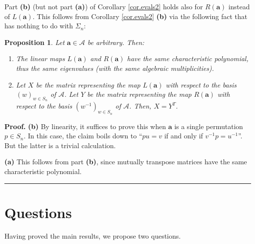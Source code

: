 \documentclass[submission]{FPSAC2026}
\newtheorem{proposition}{Proposition}
\newenvironment{proof}[1][Proof]{\noindent\textbf{#1.} }{\ \rule{0.5em}{0.5em}}
\begin{document}
Part \textbf{(b)} (but not part \textbf{(a)}) of Corollary \ref{cor.evals2}
holds also for $R\left(  \mathbf{a}\right)  $ instead of $L\left(
\mathbf{a}\right)  $. This follows from Corollary
\ref{cor.evals2} \textbf{(b)} via
the following fact that has nothing to do with $\Sigma_{n}$:

\begin{proposition}
\label{prop.L=R}Let $\mathbf{a}\in\mathcal{A}$ be arbitrary. Then:

\begin{enumerate}
\item[\textbf{(a)}] The linear maps $L\left(  \mathbf{a}\right)  $ and
$R\left(  \mathbf{a}\right)  $ have the same characteristic polynomial, thus
the same eigenvalues (with the same algebraic multiplicities).

\item[\textbf{(b)}] Let $X$ be the matrix representing the map $L\left(
\mathbf{a}\right)  $ with respect to the basis $\left(  w\right)  _{w\in
S_{n}}$ of $\mathcal{A}$. Let $Y$ be the matrix representing the map $R\left(
\mathbf{a}\right)  $ with respect to the basis $\left(  w^{-1}\right)  _{w\in
S_{n}}$ of $\mathcal{A}$. Then, $X=Y^{T}$.
\end{enumerate}
\end{proposition}

\begin{proof}
\textbf{(b)} By linearity, it suffices to prove this when $\mathbf{a}$ is a
single permutation $p\in S_{n}$. In this case, the claim boils down to
\textquotedblleft$pu=v$ if and only if $v^{-1}p=u^{-1}$\textquotedblright. But
the latter is a trivial calculation.
\medskip

\textbf{(a)} This follows from part \textbf{(b)}, since mutually transpose
matrices have the same characteristic polynomial.
\end{proof}




\section{Questions}
\label{sec.quests}

Having proved the main results, we propose two questions.
\end{document}
